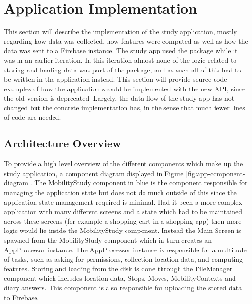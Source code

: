 \section{Application Implementation}
This section will describe the implementation of the study application, mostly regarding how data was collected, how features were computed as well as how the data was sent to a Firebase instance. The study app used the package while it was in an earlier iteration. In this iteration almost none of the logic related to storing and loading data was part of the package, and as such all of this had to be written in the application instead. This section will provide source code examples of how the application should be implemented with the new API, since the old version is deprecated. Largely, the data flow of the study app has not changed but the concrete implementation has, in the sense that much fewer lines of code are needed.

\subsection{Architecture Overview}
To provide a high level overview of the different components which make up the study application, a component diagram displayed in Figure \ref{fig:app-component-diagram}. The MobilityStudy component in blue is the component responsible for managing the application state but does not do much outside of this since the application state management required is minimal. Had it been a more complex application with many different screens and a state which had to be maintained across these screens (for example a shopping cart in a shopping app) then more logic would lie inside the MobilityStudy component. Instead the Main Screen is spawned from the MobilityStudy component which in turn creates an AppProcessor instance. The AppProcessor instance is responsible for a multitude of tasks, such as asking for permissions, collection location data, and computing features. Storing and loading from the disk is done through the FileManager component which includes location data, Stops, Moves, MobilityContexts and diary answers. This component is also responsible for uploading the stored data to Firebase.

